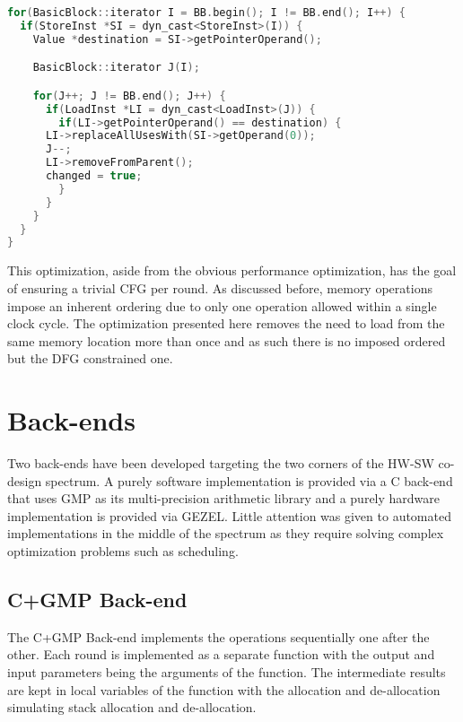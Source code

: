 \begin{lstlisting}[language=C++]
for(BasicBlock::iterator I = BB.begin(); I != BB.end(); I++) {
  if(StoreInst *SI = dyn_cast<StoreInst>(I)) {
    Value *destination = SI->getPointerOperand();

    BasicBlock::iterator J(I);

    for(J++; J != BB.end(); J++) {
      if(LoadInst *LI = dyn_cast<LoadInst>(J)) {
        if(LI->getPointerOperand() == destination) {
	  LI->replaceAllUsesWith(SI->getOperand(0));
	  J--;
	  LI->removeFromParent();
	  changed = true;
        }
      }
    }
  }
}
\end{lstlisting}

This optimization, aside from the obvious performance optimization,
has the goal of ensuring a trivial CFG per round. As discussed before,
memory operations impose an inherent ordering due to only one
operation allowed within a single clock cycle. The optimization
presented here removes the need to load from the same memory location
more than once and as such there is no imposed ordered but the DFG
constrained one.

\section{Back-ends}
\label{sec:back_ends}

Two back-ends have been developed targeting the two corners of the
HW-SW co-design spectrum. A purely software implementation is provided
via a C back-end that uses GMP as its multi-precision arithmetic
library and a purely hardware implementation is provided via GEZEL.
Little attention was given to automated implementations in the middle
of the spectrum as they require solving complex optimization problems
such as scheduling.

\subsection{C+GMP Back-end}
\label{subsec:c_back_end}

The C+GMP Back-end implements the operations sequentially one after
the other. Each round is implemented as a separate function with the
output and input parameters being the arguments of the function. The
intermediate results are kept in local variables of the function with
the allocation and de-allocation simulating stack allocation and
de-allocation.

